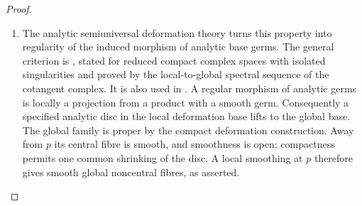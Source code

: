 \begin{proof}
\begin{enumerate}[label=\arabic*.,leftmargin=*]
\item The analytic semiuniversal deformation theory turns this
property into regularity of the induced morphism of analytic
base germs.  The general criterion is
\citet[Lemma~1, p.~93]{Manetti1991D}, stated for reduced compact
complex spaces with isolated singularities and proved by the
local-to-global spectral sequence of the cotangent complex.
It is also used in
\citet[arXiv version~2, Section~3.2, Proposition~3.3 and the following discussion, p.~11]{DlousskyTeleman2020D}.
A regular morphism of analytic
germs is locally a projection from a product with a smooth
germ.  Consequently a specified analytic disc in the local
deformation base lifts to the global base.
The global family is proper by the compact deformation
construction.  Away from $p$ its central fibre is smooth,
and smoothness is open; compactness permits one common
shrinking of the disc.  A local smoothing at $p$ therefore
gives smooth global noncentral fibres, as asserted.
\end{enumerate}
\end{proof}
